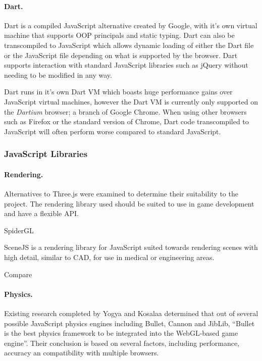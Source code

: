 \documentclass[a4paper, 12pt]{article}
\begin{document}
\paragraph{Dart.}
Dart is a compiled JavaScript alternative created by Google, with it's own virtual machine that supports OOP principals and static typing. Dart can also be transcompiled to JavaScript which allows dynamic loading of either the Dart file or the JavaScript file depending on what is supported by the browser.\cite{dart} Dart supports interaction with standard JavaScript libraries such as jQuery without needing to be modified in any way.

Dart runs in it's own Dart VM which boasts huge performance gains over JavaScript virtual machines, however the Dart VM is currently only supported on the \emph{Dartium} browser; a branch of Google Chrome. When using other browsers such as Firefox or the standard version of Chrome, Dart code transcompiled to JavaScript will often perform worse compared to standard JavaScript.\cite{dartperformance}

\subsubsection{JavaScript Libraries}

\paragraph{Rendering.}
Alternatives to Three.js were examined to determine their suitability to the project. The rendering library used should be suited to use in game development and have a flexible API.

SpiderGL

SceneJS is a rendering library for JavaScript suited towards rendering scenes with high detail, similar to CAD, for use in medical or engineering areas.

Compare

\paragraph{Physics.}
Existing research completed by Yogya and Kosalaa determined that out of several possible JavaScript physics engines including Bullet, Cannon and JibLib, ``Bullet is the best physics framework to be integrated into the WebGL-based game engine''.\cite{yogya2014comparison} Their conclusion is based on several factors, including performance, accuracy an compatibility with multiple browsers. 
\end{document}
